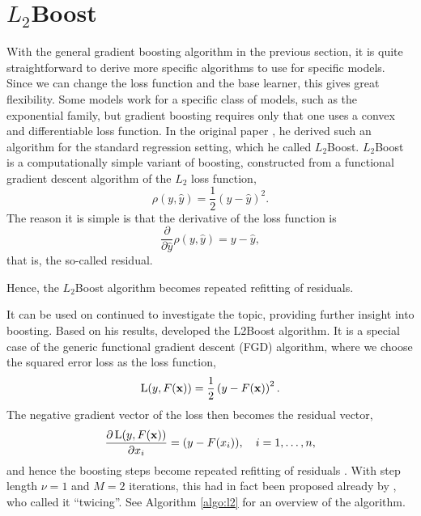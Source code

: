 \section{$L_2$Boost}
With the general gradient boosting algorithm in the previous section, it is quite straightforward to derive more specific algorithms to use for specific models. Since we can change the loss function and the base learner, this gives great flexibility. Some models work for a specific class of models, such as the exponential family, but gradient boosting requires only that one uses a convex and differentiable loss function. In the original paper \citep{friedman2001}, he derived such an algorithm for the standard regression setting, which he called $L_2$Boost. $L_2$Boost is a computationally simple variant of boosting, constructed from a functional gradient descent algorithm of the $L_2$ loss function,
\begin{equation*}
    \rho(y, \hat{y})=\frac{1}{2}(y-\hat{y})^2.
\end{equation*}
The reason it is simple is that the derivative of the loss function is
\begin{equation*}
    \frac{\partial}{\partial\hat{y}}\rho(y, \hat{y})=y-\hat{y},
\end{equation*}
that is, the so-called residual.

Hence, the $L_2$Boost algorithm becomes repeated refitting of residuals.

It can be used on 
\citet{friedman2001} continued to investigate the topic, providing further insight into boosting. Based on his results, \citet{buhlmann-yu} developed the L2Boost algorithm. It is a special case of the generic functional gradient descent (FGD) algorithm, where we choose the squared error loss as the loss function,
\begin{equation*}
    \operatorname{L}(y,F(\mathbf{x}))=\frac{1}{2}\left(y-F(\mathbf{x})\right)^2.
\end{equation*}
The negative gradient vector of the loss then becomes the residual vector,
\begin{equation*}
    \frac{\partial\operatorname{L}(y,F(\mathbf{x}))}{\partial x_i}=(y-F(x_i)),\quad i=1,\dotsc,n,
\end{equation*}
and hence the boosting steps become repeated refitting of residuals \citep{friedman2001,buhlmann-yu}. With step length $\nu=1$ and $M=2$ iterations, this had in fact been proposed already by \citep{tukey}, who called it ``twicing''. See Algorithm \ref{algo:l2} for an overview of the algorithm.

